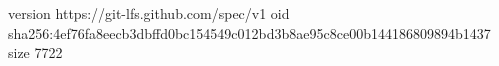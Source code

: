 version https://git-lfs.github.com/spec/v1
oid sha256:4ef76fa8eecb3dbffd0bc154549c012bd3b8ae95c8ce00b144186809894b1437
size 7722
